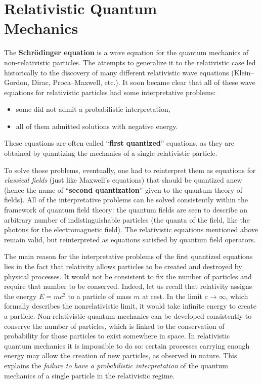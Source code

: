 \chapter[Relativistic Quantum Mechanics]{Relativistic Quantum\\Mechanics}

The \textbf{Schr\"odinger equation} is a wave equation for the quantum mechanics of non-relativistic particles. The attempts to generalize it to the relativistic case led historically to the discovery of many different relativistic wave equations (Klein--Gordon, Dirac, Proca--Maxwell, etc.). It soon became clear that all of these wave equations for relativistic particles had some interpretative problems:
\begin{itemize}
    \item[(i)] some did not admit a probabilistic interpretation,
    \item[(ii)] all of them admitted solutions with negative energy.
\end{itemize}
These equations are often called ``\textbf{first quantized}'' equations, as they are obtained by quantizing the mechanics of a single relativistic particle.

To solve those problems, eventually, one had to reinterpret them as equations for \textit{classical fields} (just like Maxwell's equations) that should be quantized anew (hence the name of ``\textbf{second quantization}'' given to the quantum theory of fields). All of the interpretative problems can be solved consistently within the framework of quantum field theory: the quantum fields are seen to describe an arbitrary number of indistinguishable particles (the quanta of the field, like the photons for the electromagnetic field). The relativistic equations mentioned above remain valid, but reinterpreted as equations satisfied by quantum field operators.

The main reason for the interpretative problems of the first quantized equations lies in the fact that relativity allows particles to be created and destroyed by physical processes. It would not be consistent to fix the number of particles and require that number to be conserved. Indeed, let us recall that relativity assigns the energy \(E = mc^2\) to a particle of mass \(m\) at rest. In the limit \(c \to \infty\), which formally describes the nonrelativistic limit, it would take infinite energy to create a particle. Non-relativistic quantum mechanics can be developed consistently to conserve the number of particles, which is linked to the conservation of probability for those particles to exist somewhere in space. In relativistic quantum mechanics it is impossible to do so: certain processes carrying enough energy may allow the creation of new particles, as observed in nature. This explains the \textit{failure to have a probabilistic interpretation} of the quantum mechanics of a single particle in the relativistic regime.

